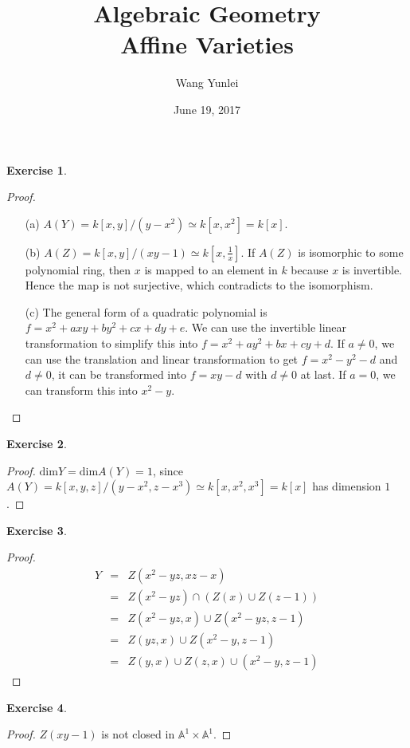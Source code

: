\documentclass{amsart}
\theoremstyle{plain}
\theoremstyle{definition}
\newtheorem{exercise}{Exercise}
\theoremstyle{remark}
\numberwithin{equation}{section}
\begin{document}
\title{Algebraic Geometry\\
	Affine Varieties}
\author{Wang Yunlei}

\date{June 19, 2017}
\maketitle
\begin{exercise}
	     
\end{exercise}
\begin{proof}
	\begin{itemize}
		\item[ ]
		\item[(a)] $ A(Y)= k[x,y]/(y-x^2)\simeq k[x,x^2]=k[x] $.
		\item[(b)] $ A(Z)=k[x,y]/(xy-1)\simeq k[x,\frac{1}{x}]$. If $ A(Z) $ is isomorphic to some polynomial ring, then $ x $ is mapped to an element in $ k $ because $ x $ is invertible. Hence the map is not surjective, which contradicts to the isomorphism.
		\item[(c)] The general form of a quadratic polynomial is $ f= x^2+axy+by^2+cx+dy+e $. We can use the invertible linear transformation to simplify this into $ f=x^2+ay^2+bx+cy+d $. If $ a\neq 0 $, we can use the translation and linear transformation to get $ f=x^2-y^2-d $ and $ d\neq 0 $, it can be transformed into $ f=xy-d $ with $ d\neq 0 $ at last. If $ a=0 $, we can transform this into $ x^2-y $. 
	\end{itemize}
\end{proof}
 \begin{exercise}
 	
 \end{exercise}
 \begin{proof}
 	$ \mathrm{dim}Y=\mathrm{dim}A(Y)=1 $, since $ A(Y)=k[x,y,z]/(y-x^2,z-x^3)\simeq k[x,x^2,x^3]=k[x] $ has dimension $ 1 $.
 \end{proof}
 \begin{exercise}

\end{exercise}
\begin{proof}
	\begin{equation}
		\begin{array}{ccc}
		Y & = & Z(x^2-yz,xz-x)\\
		  & = & Z(x^2-yz)\cap (Z(x)\cup Z(z-1))\\
		  & = & Z(x^2-yz,x)\cup Z(x^2-yz,z-1)\\
		  & = & Z(yz,x)\cup Z(x^2-y,z-1)\\
		  & = & Z(y,x)\cup Z(z,x)\cup (x^2-y,z-1)  
		\end{array}
	\end{equation}
\end{proof}
\begin{exercise}
	
\end{exercise}
\begin{proof}
	$ Z(xy-1) $ is not closed in $ \mathbb{A}^1\times\mathbb{A}^1 $.
\end{proof}
\end{document}
